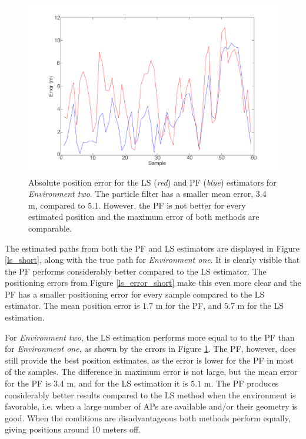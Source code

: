 \documentclass{LTHthesis}
\begin{document}
%
\begin{figure}[!hbt]

\includegraphics[width=1\textwidth ]{images/pure_rssi/ls_error_medium}
\caption{Absolute position error for the LS (\emph{red}) and PF (\emph{blue}) estimators for \emph{Environment two}. The particle filter has a smaller mean error, 3.4 m, compared to 5.1. However, the PF is not better for every estimated position and the maximum error of both methods are comparable.}\label{ls_error_medium}
\end{figure}

The estimated paths from both the PF and LS estimators are displayed in Figure \ref{ls_short}, along with the true path for \emph{Environment one}. It is clearly visible that the PF performs considerably better compared to the LS estimator. The positioning errors from Figure \ref{ls_error_short} make this even more clear and the PF has a smaller positioning error for every sample compared to the LS estimator. The mean position error is $1.7$ m for the PF, and $5.7$ m for the LS estimation.

For \emph{Environment two}, the LS estimation performs more equal to to the PF than for \emph{Environment one}, as shown by the errors in Figure \ref{ls_error_medium}. The PF, however, does still provide the best position estimates, as the error is lower for the PF in most of the samples. The difference in maximum error is not large, but the mean error for the PF is $3.4$ m, and for the LS estimation it is $5.1$ m. The PF produces considerably better results compared to the LS method when the environment is favorable, i.e. when a large number of APs are available and/or their geometry is good. When the conditions are disadvantageous both methods perform equally, giving positions around 10 meters off.
\end{document}
